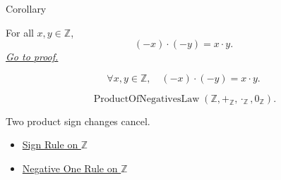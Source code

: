 \begin{corollarybox}{Corollary}
\begin{corollary}
\label{cor:product-of-negatives-on-z}
For all $x,y\in\mathbb{Z}$,
\[
(-x)\cdot(-y)=x\cdot y.
\]
\hyperref[prf:product-of-negatives-on-z]{\textit{Go to proof.}}
\end{corollary}
\end{corollarybox}

\begin{remark*}
\[
\forall x,y\in\mathbb{Z},\quad
(-x)\cdot(-y)=x\cdot y.
\]
\end{remark*}

\begin{remark*}
\[
\operatorname{ProductOfNegativesLaw}(\mathbb{Z},+_{\mathbb{Z}},\cdot_{\mathbb{Z}},0_{\mathbb{Z}}).
\]
\end{remark*}

\begin{remark*}[Interpretation]
Two product sign changes cancel.
\end{remark*}

\begin{dependencies}
\begin{itemize}
  \item \hyperref[cor:sign-rule-on-z]{Sign Rule on $\mathbb{Z}$}
  \item \hyperref[cor:negative-one-rule-on-z]{Negative One Rule on $\mathbb{Z}$}
\end{itemize}
\end{dependencies}
